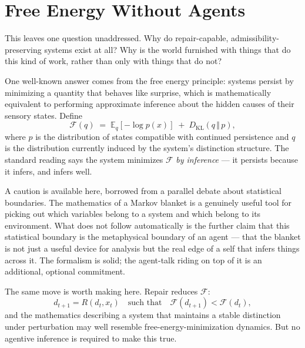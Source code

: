 \documentclass[11pt]{article}
\theoremstyle{plain}
\theoremstyle{definition}
\theoremstyle{remark}
\begin{document}
\section{Free Energy Without Agents}

This leaves one question unaddressed. Why do repair-capable, admissibility-preserving systems exist at all? Why is the world furnished with things that do this kind of work, rather than only with things that do not?

One well-known answer comes from the free energy principle: systems persist by minimizing a quantity that behaves like surprise, which is mathematically equivalent to performing approximate inference about the hidden causes of their sensory states. Define
\[
\mathcal{F}(q) \;=\; \mathbb{E}_q[-\log p(x)] \;+\; D_{\mathrm{KL}}(q \,\Vert\, p),
\]
where $p$ is the distribution of states compatible with continued persistence and $q$ is the distribution currently induced by the system's distinction structure. The standard reading says the system minimizes $\mathcal{F}$ \emph{by inference} --- it persists because it infers, and infers well.

A caution is available here, borrowed from a parallel debate about statistical boundaries. The mathematics of a Markov blanket is a genuinely useful tool for picking out which variables belong to a system and which belong to its environment. What does not follow automatically is the further claim that this statistical boundary is the metaphysical boundary of an agent --- that the blanket is not just a useful device for analysis but the real edge of a self that infers things across it. The formalism is solid; the agent-talk riding on top of it is an additional, optional commitment.

The same move is worth making here. Repair reduces $\mathcal{F}$:
\[
d_{t+1} = R(d_t, x_t) \quad \text{such that} \quad \mathcal{F}(d_{t+1}) < \mathcal{F}(d_t),
\]
and the mathematics describing a system that maintains a stable distinction under perturbation may well resemble free-energy-minimization dynamics. But no agentive inference is required to make this true.
\end{document}
